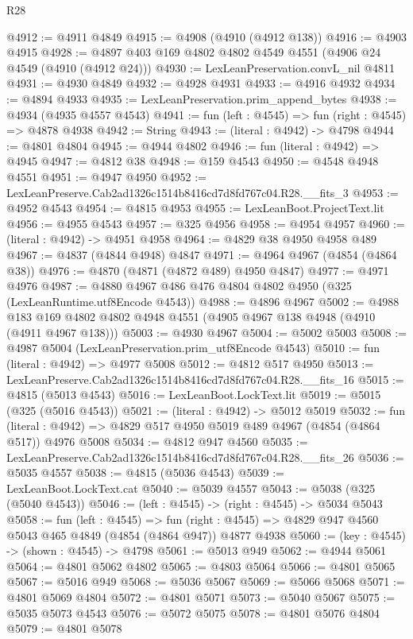 \begin{lexlean}{R28}
\begin{coremodule}
@4912 := @4911 @4849
@4915 := @4908 (@4910 (@4912 @138))
@4916 := @4903 @4915
@4928 := @4897 @403 @169 @4802 @4802 @4549 @4551 (@4906 @24 @4549 (@4910 (@4912 @24)))
@4930 := LexLeanPreservation.convL_nil @4811
@4931 := @4930 @4849
@4932 := @4928 @4931
@4933 := @4916 @4932
@4934 := @4894 @4933
@4935 := LexLeanPreservation.prim_append_bytes
@4938 := @4934 (@4935 @4557 @4543)
@4941 := fun (left : @4545) => fun (right : @4545) => @4878 @4938
@4942 := String
@4943 := (literal : @4942) -> @4798
@4944 := @4801 @4804
@4945 := @4944 @4802
@4946 := fun (literal : @4942) => @4945
@4947 := @4812 @38
@4948 := @159 @4543
@4950 := @4548 @4948 @4551
@4951 := @4947 @4950
@4952 := LexLeanPreserve.Cab2ad1326c1514b8416cd7d8fd767c04.R28.__fits_3
@4953 := @4952 @4543
@4954 := @4815 @4953
@4955 := LexLeanBoot.ProjectText.lit
@4956 := @4955 @4543
@4957 := @325 @4956
@4958 := @4954 @4957
@4960 := (literal : @4942) -> @4951 @4958
@4964 := @4829 @38 @4950 @4958 @489
@4967 := @4837 (@4844 @4948) @4847
@4971 := @4964 @4967 (@4854 (@4864 @38))
@4976 := @4870 (@4871 (@4872 @489) @4950 @4847)
@4977 := @4971 @4976
@4987 := @4880 @4967 @486 @476 @4804 @4802 @4950 (@325 (LexLeanRuntime.utf8Encode @4543))
@4988 := @4896 @4967
@5002 := @4988 @183 @169 @4802 @4802 @4948 @4551 (@4905 @4967 @138 @4948 (@4910 (@4911 @4967 @138)))
@5003 := @4930 @4967
@5004 := @5002 @5003
@5008 := @4987 @5004 (LexLeanPreservation.prim_utf8Encode @4543)
@5010 := fun (literal : @4942) => @4977 @5008
@5012 := @4812 @517 @4950
@5013 := LexLeanPreserve.Cab2ad1326c1514b8416cd7d8fd767c04.R28.__fits_16
@5015 := @4815 (@5013 @4543)
@5016 := LexLeanBoot.LockText.lit
@5019 := @5015 (@325 (@5016 @4543))
@5021 := (literal : @4942) -> @5012 @5019
@5032 := fun (literal : @4942) => @4829 @517 @4950 @5019 @489 @4967 (@4854 (@4864 @517)) @4976 @5008
@5034 := @4812 @947 @4560
@5035 := LexLeanPreserve.Cab2ad1326c1514b8416cd7d8fd767c04.R28.__fits_26
@5036 := @5035 @4557
@5038 := @4815 (@5036 @4543)
@5039 := LexLeanBoot.LockText.cat
@5040 := @5039 @4557
@5043 := @5038 (@325 (@5040 @4543))
@5046 := (left : @4545) -> (right : @4545) -> @5034 @5043
@5058 := fun (left : @4545) =>
  fun (right : @4545) => @4829 @947 @4560 @5043 @465 @4849 (@4854 (@4864 @947)) @4877 @4938
@5060 := (key : @4545) -> (shown : @4545) -> @4798
@5061 := @5013 @949
@5062 := @4944 @5061
@5064 := @4801 @5062 @4802
@5065 := @4803 @5064
@5066 := @4801 @5065
@5067 := @5016 @949
@5068 := @5036 @5067
@5069 := @5066 @5068
@5071 := @4801 @5069 @4804
@5072 := @4801 @5071
@5073 := @5040 @5067
@5075 := @5035 @5073 @4543
@5076 := @5072 @5075
@5078 := @4801 @5076 @4804
@5079 := @4801 @5078

\end{coremodule}
\end{lexlean}
